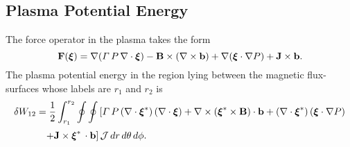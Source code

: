 \documentclass[12pt,prb,aps,notitlepage]{revtex4-1}
\newcommand{\bxi}{\mbox{\boldmath$\xi$}}
\begin{document}
\subsection{Plasma Potential Energy}
The force operator in the plasma takes the form 
\begin{equation}
{\bf F}(\bxi)= \nabla({\mit\Gamma}\,P\,\nabla\cdot\bxi) - {\bf B}\times(\nabla\times {\bf b})+\nabla(\bxi\cdot\nabla P)+{\bf J}\times  {\bf b}.
\end{equation}
The plasma potential energy in the region lying between the magnetic  flux-surfaces whose labels are $r_1$ and $r_2$ is 
\begin{align}
\delta W_{12} &= \frac{1}{2}\int_{r_1}^{r_2}\oint\oint\left[{\mit\Gamma}\,P\,(\nabla\cdot\bxi^\ast)\,(\nabla\cdot\bxi)+ \nabla\times (\bxi^\ast\times {\bf B})\cdot {\bf b}
+(\nabla\cdot\bxi^\ast)\,(\bxi\cdot\nabla P)\right.\nonumber\\[0.5ex]&\phantom{=}
\left.+{\bf J}\times \bxi^\ast\,\cdot{\bf b}\right]{\cal J}\,dr\,d\theta\,d\phi.
\end{align}
\end{document}
